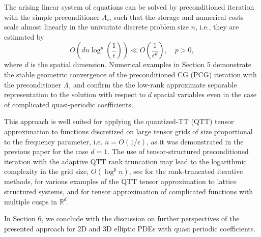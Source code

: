 \documentclass[amstex,amstext,amsfonts,epsf,12pt] {amsart}
\newcommand{\cred}{\color{red}}
\newcommand{\cn}{\color{black}}
\begin{document}
The arising linear system of equations can be solved by preconditioned iteration 
with the simple preconditioner $\Lambda_\circ$,
such that the storage and numerical costs scale almost linearly
in the univariate discrete problem size $n$, i.e., they are estimated by
\[
 O(d n  \log^p(\frac{1}{\epsilon}))\ll O(\frac{1}{\epsilon^d}),\quad p > 0,
\]
where $d$ is the spatial dimension.
Numerical examples in Section 5 demonstrate the stable geometric convergence
of the preconditioned CG (PCG) iteration with the preconditioner $\Lambda_\circ$ and 
confirm the the low-rank approximate separable representation to the solution
with respect to $d$ spacial variables even 
in the case of complicated quasi-periodic coefficients. 

This approach is well suited for applying the quantized-TT (QTT)
tensor approximation \cite{KhQuant:09}
to  functions discretized on large tensor grids of size proportional 
to the frequency parameter, i.e.  $n=O(1/\epsilon)$, as it was demonstrated in 
the previous paper \cite{BokhSRep:15} for the case $d=1$. 
The use of tensor-structured 
preconditioned iteration with the adaptive QTT rank truncation may lead to the 
logarithmic complexity in the grid size, $O(\log^p n)$,
see \cite{KhorCA:09,KhorSurv:10,OselDolg:12} 
for the rank-truncated iterative methods,   
\cite{VeBoKh:Ewald:14,VeKhorCorePeriod:14,DoKazKh_1DSPDE:12,KaRaSch:11} 
for various examples of the QTT tensor approximation 
to lattice structured systems, and \cite{BeKh3_Prot1:16}
for tensor approximation of complicated functions with multiple cusps in $\mathbb{R}^d$.

In Section 6, we conclude with the discussion on further perspectives of the presented approach
for 2D and 3D elliptic PDEs with quasi periodic coefficients.

\end{document}
